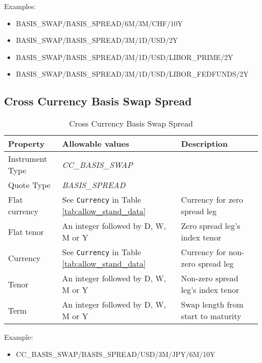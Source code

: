 \medskip
Examples:
\begin{itemize}
\item {BASIS\_SWAP/BASIS\_SPREAD/6M/3M/CHF/10Y}
\item {BASIS\_SWAP/BASIS\_SPREAD/3M/1D/USD/2Y}
\item {BASIS\_SWAP/BASIS\_SPREAD/3M/1D/USD/LIBOR\_PRIME/2Y}
\item {BASIS\_SWAP/BASIS\_SPREAD/3M/1D/USD/LIBOR\_FEDFUNDS/2Y}
\end{itemize}

\subsection{Cross Currency Basis Swap Spread}

\begin{table}[H]
\centering
  \begin{tabular}{|p{3cm}|p{3.5cm}|p{7cm}|}
    \hline
    {\bf Property} & {\bf Allowable values} & {\bf Description} \\ \hline
    Instrument Type & \emph{CC\_BASIS\_SWAP} & \\ \hline
    Quote Type & \emph{BASIS\_SPREAD} & \\ \hline
    Flat currency & See \lstinline!Currency! in Table \ref{tab:allow_stand_data} & Currency for zero spread leg\\  \hline
    Flat tenor & An integer followed by D, W, M or Y & Zero spread leg's index tenor\\ \hline
    Currency & See \lstinline!Currency! in Table \ref{tab:allow_stand_data}& Currency for non-zero spread leg\\ \hline
    Tenor & An integer followed by D, W, M or Y & Non-zero spread leg's index tenor\\ \hline
    Term & An integer followed by D, W, M or Y & Swap length from start to maturity\\ \hline
  \end{tabular}
  \caption{Cross Currency Basis Swap Spread}
  \label{tab:ccbasisspread_quote}
\end{table}


\medskip
Example:
\begin{itemize}
\item {CC\_BASIS\_SWAP/BASIS\_SPREAD/USD/3M/JPY/6M/10Y}
\end{itemize}

